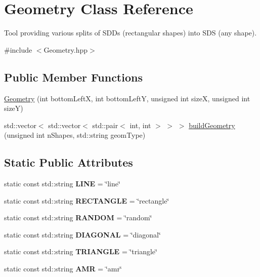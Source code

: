 \hypertarget{classGeometry}{
\section{Geometry Class Reference}
\label{classGeometry}
}


Tool providing various splits of SDDs (rectangular shapes) into SDS (any shape).  


{\ttfamily \#include $<$Geometry.hpp$>$}\subsection*{Public Member Functions}
\begin{DoxyCompactItemize}
\item 
\hyperlink{classGeometry_ac7e6a2114a9969257aa18147575cd2fb}{Geometry} (int bottomLeftX, int bottomLeftY, unsigned int sizeX, unsigned int sizeY)
\item 
std::vector$<$ std::vector$<$ std::pair$<$ int, int $>$ $>$ $>$ \hyperlink{classGeometry_a64fa42fab5fe0c5e9bb7d960bafa55fd}{buildGeometry} (unsigned int nShapes, std::string geomType)
\end{DoxyCompactItemize}
\subsection*{Static Public Attributes}
\begin{DoxyCompactItemize}
\item 
\hypertarget{classGeometry_a58cd0d80518f153a1e219140cb91980b}{
static const std::string {\bfseries LINE} = \char`\"{}line\char`\"{}}
\label{classGeometry_a58cd0d80518f153a1e219140cb91980b}

\item 
\hypertarget{classGeometry_a914bf3bdc008a1651aa315c4dd47318d}{
static const std::string {\bfseries RECTANGLE} = \char`\"{}rectangle\char`\"{}}
\label{classGeometry_a914bf3bdc008a1651aa315c4dd47318d}

\item 
\hypertarget{classGeometry_a6ac0d43e3e3e040bb7b2d1aacd2c7491}{
static const std::string {\bfseries RANDOM} = \char`\"{}random\char`\"{}}
\label{classGeometry_a6ac0d43e3e3e040bb7b2d1aacd2c7491}

\item 
\hypertarget{classGeometry_a4a7f3e4300ea2d63741981a6265b75bd}{
static const std::string {\bfseries DIAGONAL} = \char`\"{}diagonal\char`\"{}}
\label{classGeometry_a4a7f3e4300ea2d63741981a6265b75bd}

\item 
\hypertarget{classGeometry_ac7c81afa8454187adc7be4e7b7f68d3c}{
static const std::string {\bfseries TRIANGLE} = \char`\"{}triangle\char`\"{}}
\label{classGeometry_ac7c81afa8454187adc7be4e7b7f68d3c}

\item 
\hypertarget{classGeometry_ad93926a0e530cc7e85a79ebc9da99b32}{
static const std::string {\bfseries AMR} = \char`\"{}amr\char`\"{}}
\label{classGeometry_ad93926a0e530cc7e85a79ebc9da99b32}

\end{DoxyCompactItemize}


